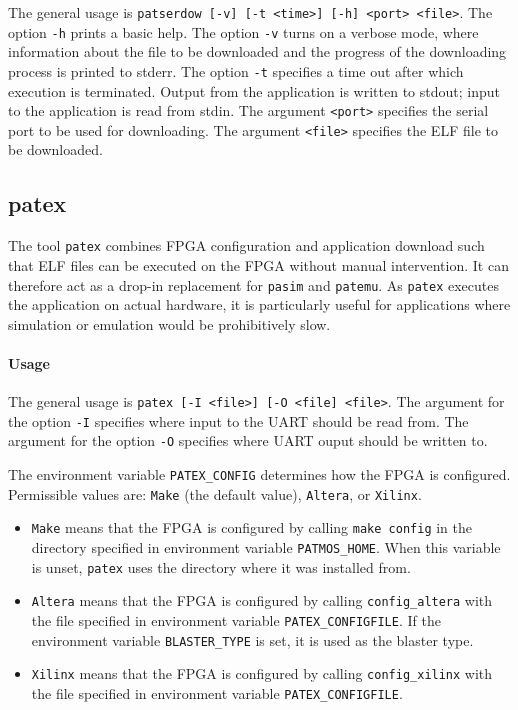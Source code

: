 \documentclass[a4paper,fontsize=10pt,twoside,DIV15,BCOR12mm,headinclude=true,footinclude=false,pagesize,bibtotoc]{scrbook}
\begin{document}
The general usage is \texttt{patserdow [-v] [-t <time>] [-h] <port> <file>}. The
option \texttt{-h} prints a basic help. The option \texttt{-v} turns
on a verbose mode, where information about the file to be downloaded
and the progress of the downloading process is printed to
stderr. The option \texttt{-t} specifies a time out after which execution is terminated.
Output from the application is written to stdout; input to the
application is read from stdin. The argument \texttt{<port>} specifies
the serial port to be used for downloading. The argument
\texttt{<file>} specifies the ELF file to be downloaded.

\subsection{patex}

The tool \texttt{patex} combines FPGA configuration and application
download such that ELF files can be executed on the FPGA without
manual intervention. It can therefore act as a drop-in replacement for
\texttt{pasim} and \texttt{patemu}. As \texttt{patex}
executes the application on actual hardware, it is particularly useful
for applications where simulation or emulation would be prohibitively
slow.

\paragraph{Usage}

The general usage is \texttt{patex [-I <file>] [-O <file] <file>}. The
argument for the option \texttt{-I} specifies where input to the UART
should be read from. The argument for the option \texttt{-O} specifies
where UART ouput should be written to.

The environment variable \texttt{PATEX\_CONFIG} determines how the
FPGA is configured. Permissible values are: \texttt{Make} (the default
value), \texttt{Altera}, or \texttt{Xilinx}.
\begin{itemize}
\item \texttt{Make} means that the FPGA is configured by calling
  \texttt{make config} in the directory specified in environment
  variable \texttt{PATMOS\_HOME}. When this variable is unset,
  \texttt{patex} uses the directory where it was installed from.
\item \texttt{Altera} means that the FPGA is configured by calling
  \texttt{config\_altera} with the file specified in environment
  variable \texttt{PATEX\_CONFIGFILE}. If the environment variable
  \texttt{BLASTER\_TYPE} is set, it is used as the blaster type.
\item \texttt{Xilinx} means that the FPGA is configured by calling
  \texttt{config\_xilinx} with the file specified in environment
  variable \texttt{PATEX\_CONFIGFILE}.
\end{itemize}
\end{document}
